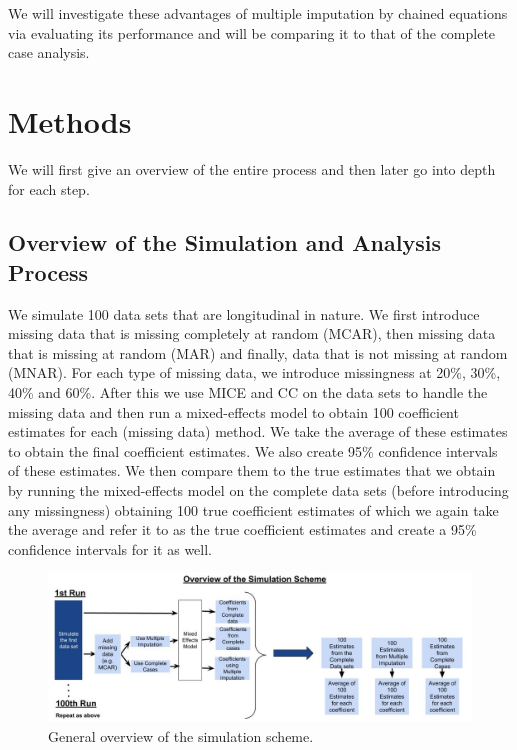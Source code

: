 \documentclass[fleqn,10pt]{wlscirep}\usepackage[]{graphicx}\usepackage[]{color}
\begin{document}
We will investigate these advantages of multiple imputation by chained equations via evaluating its performance and will be comparing it to that of the complete case analysis. 


\section{Methods}

We will first give an overview of the entire process and then later go into depth for each step.  

\subsection{Overview of the Simulation and Analysis Process}

We simulate 100 data sets that are longitudinal in nature. We first introduce missing data that is missing completely at random (MCAR), then missing data that is missing at random (MAR) and finally, data that is not missing at random (MNAR). For each type of missing data, we introduce missingness at 20\%, 30\%, 40\% and 60\%. After this we use MICE and CC on the data sets to handle the missing data and then run a mixed-effects model to obtain 100 coefficient estimates for each (missing data) method. We take the average of these estimates to obtain the final coefficient estimates. We also create 95\% confidence intervals of these estimates. We then compare them to the true estimates that we obtain by running the mixed-effects model on the complete data sets (before introducing any missingness) obtaining 100 true coefficient estimates of which we again take the average and refer it to as the true coefficient estimates and create a 95\% confidence intervals for it as well. 

\begin{figure}[H]
\centering
\includegraphics[width=\linewidth]{simulation_schema}
\caption{General overview of the simulation scheme.}
\label{fig:simulation_schema}
\end{figure}
\end{document}

